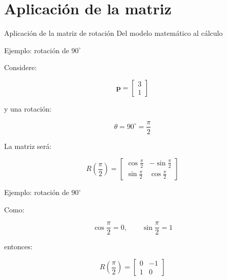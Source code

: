 \documentclass[aspectratio=169]{beamer}
\begin{document}
\section{Aplicación de la matriz}

\SectionSlide
{Aplicación de la matriz de rotación}
{Del modelo matemático al cálculo}

\begin{frame}{Ejemplo: rotación de \texorpdfstring{$90^\circ$}{90 grados}}

    Considere:

    \[
    \mathbf{p}
    =
    \begin{bmatrix}
        3\\
        1
    \end{bmatrix}
    \]

    y una rotación:

    \[
    \theta=90^\circ
    =
    \frac{\pi}{2}
    \]

    La matriz será:

    \[
    R\left(\frac{\pi}{2}\right)
    =
    \begin{bmatrix}
        \cos\frac{\pi}{2} & -\sin\frac{\pi}{2}\\
        \sin\frac{\pi}{2} & \cos\frac{\pi}{2}
    \end{bmatrix}
    \]

\end{frame}

\begin{frame}{Ejemplo: rotación de \texorpdfstring{$90^\circ$}{90 grados}}

    Como:

    \[
    \cos\frac{\pi}{2}=0,
    \qquad
    \sin\frac{\pi}{2}=1
    \]

    entonces:

    \[
    R\left(\frac{\pi}{2}\right)
    =
    \begin{bmatrix}
        0 & -1\\
        1 & 0
    \end{bmatrix}
    \]

\end{frame}
\end{document}
